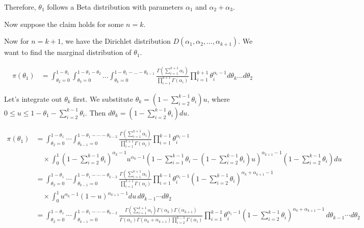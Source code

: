 \documentclass[a4paper]{article}
\begin{document}
Therefore, \(\theta_1\) follows a Beta distribution with parameters \(\alpha_1\) and \(\alpha_2 + \alpha_3\).

Now suppose the claim holds for some \(n = k\).

Now for \(n = k+1\), we have the Dirichlet distribution \(D(\alpha_1, \alpha_2, ..., \alpha_{k+1})\). We want to find the marginal distribution of \(\theta_1\).

\begin{align*}
    \pi(\theta_1) &= \int_{\theta_2=0}^{1-\theta_1} \int_{\theta_3=0}^{1-\theta_1-\theta_2} ... \int_{\theta_k=0}^{1-\theta_1-...-\theta_{k-1}} \frac{\Gamma(\sum_{i=1}^{k+1} \alpha_i)}{\prod_{i=1}^{k+1} \Gamma(\alpha_i)} \prod_{i=1}^{k+1} \theta_i^{\alpha_i - 1} d\theta_k ... d\theta_2 
\end{align*}

Let's integrate out \(\theta_k\) first. We substitute \(\theta_k = (1 - \sum_{i=2}^{k-1} \theta_i)u\), where \(0 \leq u \leq 1 - \theta_1 - \sum_{i=2}^{k-1} \theta_i\). Then \(d\theta_k = (1 - \sum_{i=2}^{k-1} \theta_i) du\).

\begin{align*}
    \pi(\theta_1) &= \int_{\theta_2=0}^{1-\theta_1} \cdots \int_{\theta_{k-1}=0}^{1-\theta_1-\cdots-\theta_{k-2}} \frac{\Gamma(\sum_{i=1}^{k+1} \alpha_i)}{\prod_{i=1}^{k+1} \Gamma(\alpha_i)} \prod_{i=1}^{k-1} \theta_i^{\alpha_i - 1} \\
    & \quad \times \int_{0}^{1} \left(1 - \sum_{i=2}^{k-1} \theta_i \right)^{\alpha_k - 1} u^{\alpha_k - 1} \left(1 - \sum_{i=1}^{k-1} \theta_i - (1 - \sum_{i=2}^{k-1} \theta_i)u \right)^{\alpha_{k+1} - 1} \left(1 - \sum_{i=2}^{k-1} \theta_i \right) du \\
    &= \int_{\theta_2=0}^{1-\theta_1} \cdots \int_{\theta_{k-1}=0}^{1-\theta_1-\cdots-\theta_{k-2}} \frac{\Gamma(\sum_{i=1}^{k+1} \alpha_i)}{\prod_{i=1}^{k+1} \Gamma(\alpha_i)} \prod_{i=1}^{k-1} \theta_i^{\alpha_i - 1} \left(1 - \sum_{i=2}^{k-1} \theta_i \right)^{\alpha_k + \alpha_{k+1} - 1} \\
    & \quad \times \int_{0}^{1} u^{\alpha_k - 1} (1-u)^{\alpha_{k+1} - 1} du \, d\theta_{k-1} \cdots d\theta_2 \\
    &= \int_{\theta_2=0}^{1-\theta_1} \cdots \int_{\theta_{k-1}=0}^{1-\theta_1-\cdots-\theta_{k-2}} \frac{\Gamma(\sum_{i=1}^{k+1} \alpha_i) \Gamma(\alpha_k) \Gamma(\alpha_{k+1})}{\Gamma(\alpha_1) \Gamma(\alpha_k + \alpha_{k+1}) \prod_{i=2}^{k-1} \Gamma(\alpha_i)} \prod_{i=1}^{k-1} \theta_i^{\alpha_i - 1} \left(1 - \sum_{i=2}^{k-1} \theta_i \right)^{\alpha_k + \alpha_{k+1} - 1} \, d\theta_{k-1} \cdots d\theta_2 \\
\end{align*}
\end{document}
